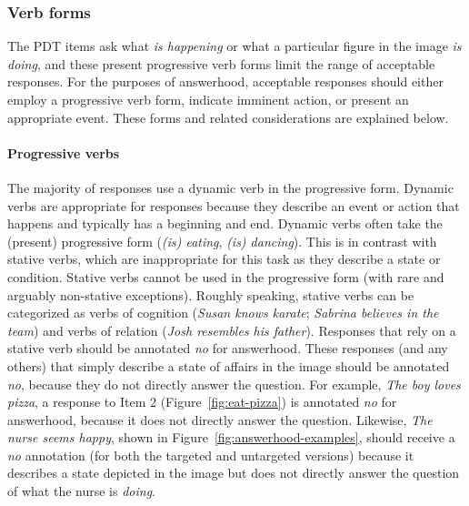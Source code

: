 \documentclass[12pt,notitlepage]{article}
\begin{document}

\subsubsection{Verb forms}
\label{subsubsection:answerhood-verbs}
The PDT items ask what \textit{is happening} or what a particular figure in the image \textit{is doing}, and these present progressive verb forms limit the range of acceptable responses. For the purposes of answerhood, acceptable responses should either employ a progressive verb form,  indicate imminent action, or present an appropriate event. These forms and related considerations are explained below.

\paragraph{Progressive verbs} The majority of responses use a dynamic verb in the progressive form. Dynamic verbs are appropriate for responses because they describe an event or action that happens and typically has a beginning and end. Dynamic verbs often take the (present) progressive form (\textit{(is) eating}, \textit{(is) dancing}). This is in contrast with stative verbs, which are inappropriate for this task as they describe a state or condition. Stative verbs cannot be used in the progressive form (with rare and arguably non-stative exceptions). Roughly speaking, stative verbs can be categorized as verbs of cognition (\textit{Susan knows karate}; \textit{Sabrina believes in the team}) and verbs of relation (\textit{Josh resembles his father}). Responses that rely on a stative verb should be annotated \textit{no} for answerhood. These responses (and any others) that simply describe a state of affairs in the image should be annotated \textit{no}, because they do not directly answer the question. For example, \textit{The boy loves pizza}, a response to Item 2 (Figure~\ref{fig:eat-pizza}) is annotated \textit{no} for answerhood, because it does not directly answer the question. Likewise, \textit{The nurse seems happy}, shown in Figure~\ref{fig:answerhood-examples}, should receive a \textit{no} annotation (for both the targeted and untargeted versions) because it describes a state depicted in the image but does not directly answer the question of what the nurse is \textit{doing}.
\end{document}

